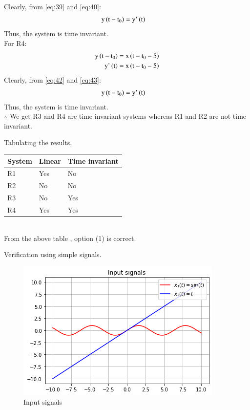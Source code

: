 \documentclass[journal,12pt,twocolumn]{IEEEtran}
\begin{document}
Clearly, from \eqref{eq:39} and \eqref{eq:40}:
\begin{align}
\label{eq:41}
    \text{y}\left(\text{t}-\text{t}_{0}\right) ={}& \text{y'}\left(\text{t}\right)
\end{align}
Thus, the system is time invariant.\\
For R4:
\begin{align}
\label{eq:42}
 \text{y}\left(\text{t}-\text{t}_{0}\right) ={}& \text{x}\left(\text{t}-\text{t}_{0}-5\right)\\
 \label{eq:43}
  \text{y'}\left(\text{t}\right)={}& \text{x}\left(\text{t}-\text{t}_{0}-5\right)
\end{align}
Clearly, from \eqref{eq:42} and \eqref{eq:43}:
\begin{align}
\label{eq:44}
    \text{y}\left(\text{t}-\text{t}_{0}\right) ={}& \text{y'}\left(\text{t}\right)
\end{align}
Thus, the system is time invariant.\\

$\therefore$ We get R3 and R4 are time invariant systems whereas R1 and R2 are not time invariant. 

Tabulating the results,
\\
\begin{table}[h]
\label{table:questions}
\begin{tabular}{ |m{1.5cm}|m{2cm}|m{2.5cm}| } 
 \hline
 System & Linear & Time invariant \\ 
 \hline
R1 & Yes & No\\[1ex]
 \hline
 R2 & No & No\\[1ex]
 \hline
 R3 & No & Yes\\[1ex]
 \hline
 R4 & Yes & Yes\\[1ex]
 \hline
\end{tabular}

\end{table}\\
From the above table , option (1) is correct.

Verification using simple signals.\\

\begin{figure}[h]
\caption{Input signals}
\includegraphics[width = \columnwidth]{input}
\end{figure}
\end{document}

